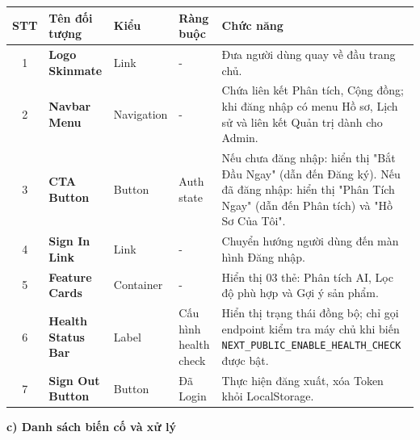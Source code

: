 \documentclass[12pt,a4paper]{article}
\begin{document}
\begin{center}
\renewcommand{\arraystretch}{1.5}
\begin{tabularx}{\textwidth}{|c|l|l|l|X|}
\hline
\rowcolor{blue!20}
\textbf{STT} & \textbf{Tên đối tượng} & \textbf{Kiểu} & \textbf{Ràng buộc} & \textbf{Chức năng} \\ \hline

1 & \textbf{Logo Skinmate} & Link & - & Đưa người dùng quay về đầu trang chủ. \\ \hline

2 & \textbf{Navbar Menu} & Navigation & - & Chứa liên kết Phân tích, Cộng đồng; khi đăng nhập có menu Hồ sơ, Lịch sử và liên kết Quản trị dành cho Admin. \\ \hline

3 & \textbf{CTA Button} & Button & Auth state & Nếu chưa đăng nhập: hiển thị "Bắt Đầu Ngay" (dẫn đến Đăng ký). Nếu đã đăng nhập: hiển thị "Phân Tích Ngay" (dẫn đến Phân tích) và "Hồ Sơ Của Tôi". \\ \hline

4 & \textbf{Sign In Link} & Link & - & Chuyển hướng người dùng đến màn hình Đăng nhập. \\ \hline

5 & \textbf{Feature Cards} & Container & - & Hiển thị 03 thẻ: Phân tích AI, Lọc độ phù hợp và Gợi ý sản phẩm. \\ \hline

6 & \textbf{Health Status Bar} & Label & Cấu hình health check & Hiển thị trạng thái đồng bộ; chỉ gọi endpoint kiểm tra máy chủ khi biến \texttt{NEXT\_PUBLIC\_ENABLE\_HEALTH\_CHECK} được bật. \\ \hline

7 & \textbf{Sign Out Button} & Button & Đã Login & Thực hiện đăng xuất, xóa Token khỏi LocalStorage. \\ \hline

\end{tabularx}
\end{center}

\textbf{c) Danh sách biến cố và xử lý}
\end{document}
